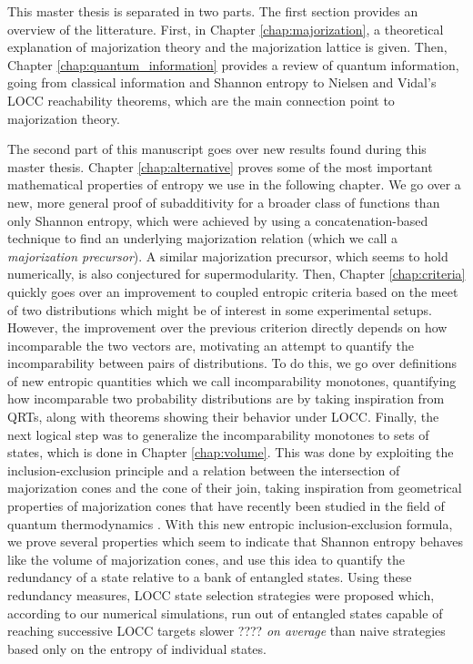 This master thesis is separated in two parts. The first section provides an overview of the litterature. First, in Chapter \ref{chap:majorization}, a theoretical explanation of majorization theory and the majorization lattice is given. Then, Chapter \ref{chap:quantum_information} provides a review of quantum information, going from classical information and Shannon entropy to Nielsen and Vidal's LOCC reachability theorems, which are the main connection point to majorization theory.

The second part of this manuscript goes over new results found during this master thesis. Chapter \ref{chap:alternative} proves some of the most important mathematical properties of entropy we use in the following chapter. We go over a new, more general proof of subadditivity for a broader class of functions than only Shannon entropy, which were achieved by using a concatenation-based technique to find an underlying majorization relation (which we call a \textit{majorization precursor}). A similar majorization precursor, which seems to hold numerically, is also conjectured for supermodularity. Then, Chapter \ref{chap:criteria} quickly goes over an improvement to coupled entropic criteria based on the meet of two distributions which might be of interest in some experimental setups. However, the improvement over the previous criterion directly depends on how incomparable the two vectors are, motivating an attempt to quantify the incomparability between pairs of distributions. To do this, we go over definitions of new entropic quantities which we call incomparability monotones, quantifying how incomparable two probability distributions are by taking inspiration from QRTs, along with theorems showing their behavior under LOCC. Finally, the next logical step was to generalize the incomparability monotones to sets of states, which is done in Chapter \ref{chap:volume}. This was done by exploiting the inclusion-exclusion principle and a relation between the intersection of majorization cones and the cone of their join, taking inspiration from geometrical properties of majorization cones that have recently been studied in the field of quantum thermodynamics \cite{junior_geometric_2022}. With this new entropic inclusion-exclusion formula, we prove several properties which seem to indicate that Shannon entropy behaves like the volume of majorization cones, and use this idea to quantify the redundancy of a state relative to a bank of entangled states. Using these redundancy measures, LOCC state selection strategies were proposed which, according to our numerical simulations, run out of entangled states capable of reaching successive LOCC targets slower ???? \textit{on average} than naive strategies based only on the entropy of individual states.
